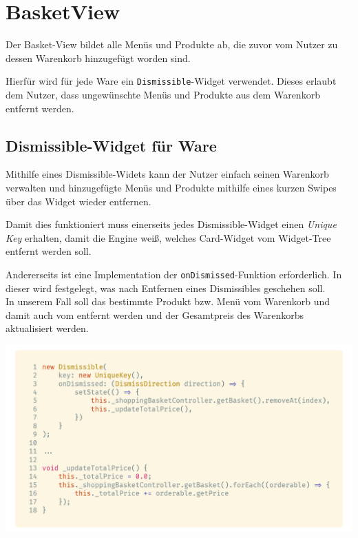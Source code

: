 \section{BasketView}
\label{basketview}

Der Basket-View bildet alle Menüs und Produkte ab, die zuvor vom Nutzer zu dessen Warenkorb hinzugefügt
worden sind.

Hierfür wird für jede Ware ein \lstinline{Dismissible}-Widget verwendet. Dieses erlaubt dem Nutzer, dass ungewünschte Menüs und Produkte aus dem Warenkorb entfernt werden.
\cite{flutterDismissible}

\subsection{Dismissible-Widget für Ware}

Mithilfe eines Dismissible-Widets kann der Nutzer einfach seinen Warenkorb verwalten und hinzugefügte
Menüs und Produkte mithilfe eines kurzen Swipes über das Widget wieder entfernen.

Damit dies funktioniert muss einerseits jedes Dismissible-Widget einen \textit{Unique Key} erhalten,
damit die Engine weiß, welches Card-Widget vom Widget-Tree entfernt werden soll.

Andererseits ist eine Implementation der \lstinline{onDismissed}-Funktion erforderlich. In dieser
wird festgelegt, was nach Entfernen eines Dismissibles geschehen soll.\\
In unserem Fall soll das bestimmte Produkt bzw. Menü vom Warenkorb und damit auch vom
 entfernt werden und der Gesamtpreis des Warenkorbs aktualisiert werden.

\begin{code}[H]
    \centering
    \includegraphics[width=1\textwidth]{images/Client/views/basketview/dismissible.png}
    \vspace{-20pt}
    \caption{Dismissible-Widget im Basket-View mit \lstinline{_updateTotalPrice}-Funktion zum Aktualisieren des Gesamtpreises}
    \label{dismissible}
\end{code}

